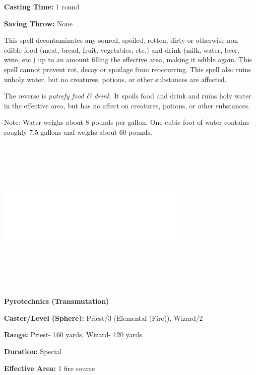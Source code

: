 \begin{multicols}{2}
\begin{minipage}{\columnwidth}
\noindent \textbf{Casting Time:} 1 round

\noindent \textbf{Saving Throw:} None

\end{minipage}

This spell decontaminates any soured, spoiled, rotten, dirty or otherwise non-edible food (meat, bread, fruit, vegetables, etc.) and drink (milk, water, beer, wine, etc.) up to an amount filling the effective area, making it edible again.  This spell cannot prevent rot, decay or spoilage from reoccurring.  This spell also ruins unholy water, but no creatures, potions, or other substances are affected.

The reverse is \textit{putrefy food \& drink}.  It spoils food and drink and ruins holy water in the effective area, but has no affect on creatures, potions, or other substances.

Note: Water weighs about 8 pounds per gallon.  One cubic foot of water contains roughly 7.5 gallons and weighs about 60 pounds.

\noindent\includegraphics[width=3.6in, height=3in]{testblock.pdf}

\vspace{1em}

\noindent
\begin{minipage}{\columnwidth}

\noindent \textbf{Pyrotechnics (Transmutation)}

\noindent \textbf{Caster/Level (Sphere):} Priest/3 (Elemental (Fire)), Wizard/2

\noindent \textbf{Range:} Priest- 160 yards, Wizard- 120 yards

\noindent \textbf{Duration:} Special

\noindent \textbf{Effective Area:} 1 fire source


\end{minipage}
\end{multicols}

